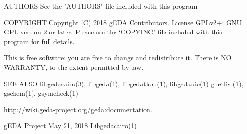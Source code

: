 AUTHORS
       See the "AUTHORS" file included with this program.

COPYRIGHT
       Copyright (C) 2018 gEDA Contributors. License GPLv2+: GNU GPL
       version 2 or later. Please see the `COPYING' file included with this
       program for full details.

       This is free software: you are free to change and redistribute it.
       There is NO WARRANTY, to the extent permitted by law.

SEE ALSO
       libgedacairo(3), libgeda(1), libgedathon(1), libgedauio(1) gnetlist(1),
       gschem(1), gsymcheck(1)

       http://wiki.geda-project.org/geda:documentation.



gEDA Project                     May 21, 2018                  Libgedacairo(1)

